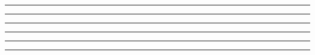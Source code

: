 
\nopagenumbers
\topskip 0pt
\parindent 0pt
\parskip 0pt


\null
{}
\vfil\eject


\hrule height 1sp width 1sp depth 0sp
\vfil\eject


{%
\hsize 10in
\vsize 12in
\hoffset -1in
\voffset -1in
\hrule height 1sp      width 8.299in depth 0sp
\hrule height 11.695in width 8.299in depth 0sp
\vfil\eject


\hrule height 1sp      width 8.301in depth 0sp
\hrule height 11.695in width 8.301in depth 0sp
\vfil\eject


\hrule height 11.701in width 8.299in depth 0sp
\vfil\eject

}%


